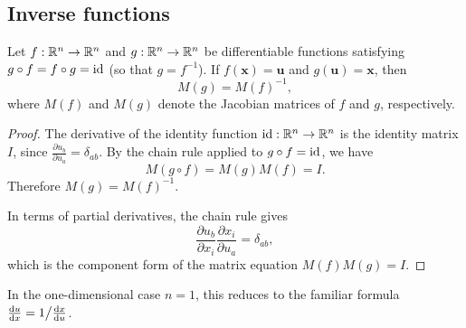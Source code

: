 \documentclass[a4paper]{article}
\begin{document}
\subsection{Inverse functions}

\begin{prop}
  Let $f: \mathbb{R}^n \to \mathbb{R}^n$ and $g: \mathbb{R}^n \to \mathbb{R}^n$ be differentiable functions satisfying $g \circ f = f \circ g = \operatorname{id}$ (so that $g = f^{-1}$). If $f(\mathbf{x}) = \mathbf{u}$ and $g(\mathbf{u}) = \mathbf{x}$, then
  \[
    M(g) = M(f)^{-1},
  \]
  where $M(f)$ and $M(g)$ denote the Jacobian matrices of $f$ and $g$, respectively.
\end{prop}

\begin{proof}
  The derivative of the identity function $\operatorname{id}: \mathbb{R}^n \to \mathbb{R}^n$ is the identity matrix $I$, since $\frac{\partial u_b}{\partial u_a} = \delta_{ab}$. By the chain rule applied to $g \circ f = \operatorname{id}$, we have
  \[
    M(g \circ f) = M(g) M(f) = I.
  \]
  Therefore $M(g) = M(f)^{-1}$.

  In terms of partial derivatives, the chain rule gives
  \[
    \frac{\partial u_b}{\partial x_i}\frac{\partial x_i}{\partial u_a} = \delta_{ab},
  \]
  which is the component form of the matrix equation $M(f)M(g) = I$.
\end{proof}

\begin{rmk}
  In the one-dimensional case $n = 1$, this reduces to the familiar formula $\frac{\mathrm{d} u}{\mathrm{d} x} = 1\big/\frac{\mathrm{d} x}{\mathrm{d} u}$.
\end{rmk}
\end{document}
